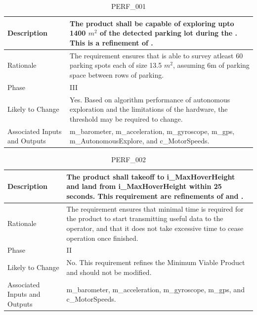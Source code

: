 \documentclass{article}
\begin{document}
\begin{table}[!h]
\begin{center}
\caption {PERF\_001} 
\label{PERF_001}
\begin{tabular}{ | m{3cm} | m{11cm} | }
\hline
Description & The product shall be capable of exploring upto 1400 $ m^2 $ of the detected parking lot during the \nameref{Autonomous Explore State}. This is a refinement of \nameref{STA_003}. \\
\hline
Rationale & The requirement ensures that \nameref{Autonomous Explore State} is able to survey atleast 60 parking spots each of size 13.5 $ m^2 $, assuming 6m of parking space between rows of parking. \\
\hline
Phase & III \\
\hline
Likely to Change & Yes. Based on algorithm performance of autonomous exploration and the limitations of the hardware, the threshold may be required to change. \\
\hline
Associated Inputs and Outputs & m\_barometer, m\_acceleration, m\_gyroscope, m\_gps, m\_AutonomousExplore, and c\_MotorSpeeds.  \\
\hline
\end{tabular}
\end{center}
\end{table}

\begin{table}[!h]
\begin{center}
\caption {PERF\_002} 
\label{PERF_002}
\begin{tabular}{ | m{3cm} | m{11cm} | }
\hline
Description & The product shall takeoff to i\_MaxHoverHeight and land from i\_MaxHoverHeight within 25 seconds. This requirement are refinements of \nameref{STA_001} and \nameref{STA_006}.  \\
\hline
Rationale &  The requirement ensures that minimal time is required for the product to start transmitting useful data to the operator, and that it does not take excessive time to cease operation once finished. \\
\hline
Phase & II \\
\hline
Likely to Change & No. This requirement refines the Minimum Viable Product and should not be modified. \\
\hline
Associated Inputs and Outputs & m\_barometer, m\_acceleration, m\_gyroscope, m\_gps, and c\_MotorSpeeds.  \\
\hline
\end{tabular}
\end{center}
\end{table}
\end{document}
